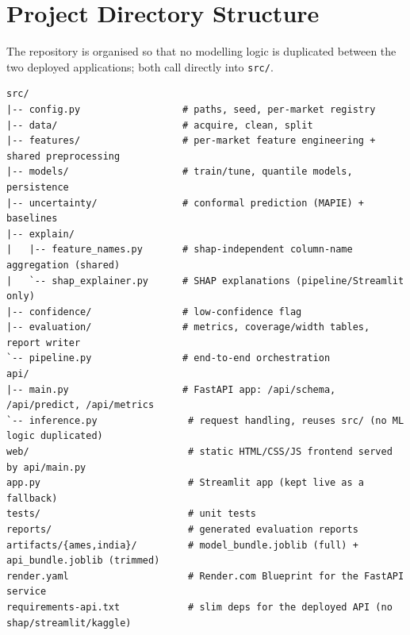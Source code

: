 \documentclass[12pt]{report}
\begin{document}
\chapter{Project Directory Structure}

The repository is organised so that no modelling logic is duplicated between the two
deployed applications; both call directly into \texttt{src/}.

{\scriptsize
\begin{verbatim}
src/
|-- config.py                  # paths, seed, per-market registry
|-- data/                      # acquire, clean, split
|-- features/                  # per-market feature engineering + shared preprocessing
|-- models/                    # train/tune, quantile models, persistence
|-- uncertainty/               # conformal prediction (MAPIE) + baselines
|-- explain/
|   |-- feature_names.py       # shap-independent column-name aggregation (shared)
|   `-- shap_explainer.py      # SHAP explanations (pipeline/Streamlit only)
|-- confidence/                # low-confidence flag
|-- evaluation/                # metrics, coverage/width tables, report writer
`-- pipeline.py                # end-to-end orchestration
api/
|-- main.py                    # FastAPI app: /api/schema, /api/predict, /api/metrics
`-- inference.py                # request handling, reuses src/ (no ML logic duplicated)
web/                            # static HTML/CSS/JS frontend served by api/main.py
app.py                          # Streamlit app (kept live as a fallback)
tests/                          # unit tests
reports/                        # generated evaluation reports
artifacts/{ames,india}/         # model_bundle.joblib (full) + api_bundle.joblib (trimmed)
render.yaml                     # Render.com Blueprint for the FastAPI service
requirements-api.txt            # slim deps for the deployed API (no shap/streamlit/kaggle)
\end{verbatim}
}
\end{document}
